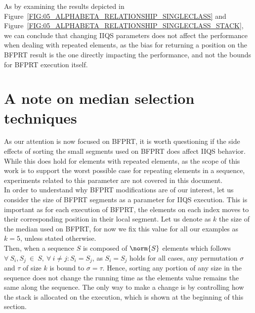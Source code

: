 As by examining the results depicted in Figure~\ref{FIG:05_ALPHABETA_RELATIONSHIP_SINGLECLASS}  and Figure~\ref{FIG:05_ALPHABETA_RELATIONSHIP_SINGLECLASS_STACK}, we can conclude that changing IIQS parameters does not affect the performance when dealing with repeated elements, as the bias for returning a position on the BFPRT result is the one directly impacting the performance, and not the bounds for BFPRT execution itself.\\

\section{A note on median selection techniques}
\label{SECTION:NOTE_ON_MEDIAN_SELECTION}

As our attention is now focused on BFPRT, it is worth questioning if the side effects of sorting the small segments used on BFPRT does affect IIQS behavior. While this does hold for elements with repeated elements, as the scope of this work is to support the worst possible case for repeating elements in a sequence, experiments related to this parameter are not covered in this document.\\

In order to understand why BFPRT modifications are of our interest, let us consider the size of BFPRT segments as a parameter for IIQS execution. This is important as for each execution of BFPRT, the elements on each index moves to their corresponding position in their local segment. Let us denote as $k$ the size of the median used on BFPRT, for now we fix this value for all our examples as $k=5$, unless stated otherwise.\\

Then, when a sequence $S$ is composed of $\norm{S}$ elements which follows $\forall~S_i, S_j~\in~S,~\forall~ i \neq j : S_i=S_j$, as $S_i=S_j$ holds for all cases, any permutation $\sigma$ and $\tau$ of size $k$ is bound to $\sigma = \tau$. Hence, sorting any portion of any size in the sequence does not change the running time as the elements value remains the same along the sequence. The only way to make a change is by controlling how the stack is allocated on the execution, which is shown at the beginning of this section.\\

\FloatBarrier